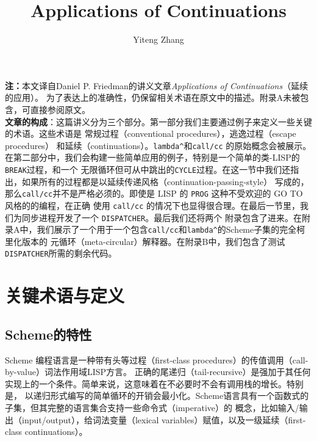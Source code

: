 \documentclass[12pt]{article}
\title{Applications of Continuations}
\author{Yiteng Zhang}
\begin{document}
\maketitle

\noindent{}\textbf{注：}本文译自Daniel P. Friedman的讲义文章\textsl{Applications of Continuations}（延续的应用）。
为了表达上的准确性，仍保留相关术语在原文中的描述。附录A未被包含，可直接参阅原文。
~\\

\noindent{}\textbf{文章的构成}：这篇讲义分为三个部分。第一部分我们主要通过例子来定义一些关键的术语。这些术语是
常规过程（conventional procedures），逃逸过程（escape procedures） 和延续（continuations）。\texttt{lambda\^{}}和\texttt{call/cc}
的原始概念会被展示。在第二部分中，我们会构建一些简单应用的例子，特别是一个简单的类-LISP的\texttt{BREAK}过程，和一个
无限循环但可从中跳出的\texttt{CYCLE}过程。在这一节中我们还指出，如果所有的过程都是以延续传递风格（continuation-passing-style）
写成的，那么\texttt{call/cc}并不是严格必须的。即使是 LISP 的 \texttt{PROG} 这种不受欢迎的 GO TO 风格的的编程，在正确
使用 \texttt{call/cc} 的情况下也显得很合理。在最后一节里，我们为同步进程开发了一个 \texttt{DISPATCHER}。最后我们还将两个
附录包含了进来。在附录A中，我们展示了一个用于一个包含\texttt{call/cc}和\texttt{lambda\^{}}的Scheme子集的完全柯里化版本的
元循环（meta-circular）解释器。在附录B中，我们包含了测试\texttt{DISPATCHER}所需的剩余代码。

\section{关键术语与定义}
\subsection{Scheme的特性}
\indent{}Scheme 编程语言是一种带有头等过程（first-class procedures）的传值调用（call-by-value）词法作用域LISP方言。
正确的尾递归（tail-recursive）是强加于其任何实现上的一个条件。简单来说，这意味着在不必要时不会有调用栈的增长。特别是，
以递归形式编写的简单循环的开销会最小化。Scheme语言具有一个函数式的子集，但其完整的语言集合支持一些命令式（imperative）的
概念，比如输入/输出（input/output），给词法变量（lexical variables）赋值，以及一级延续（first-class continuations）。
\end{document}
